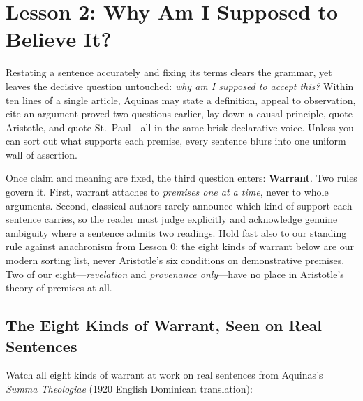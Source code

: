 \section{Lesson 2: Why Am I Supposed to Believe It?}

Restating a sentence accurately and fixing its terms clears the grammar, yet leaves the decisive question untouched: \emph{why am I supposed to accept this?} Within ten lines of a single article, Aquinas may state a definition, appeal to observation, cite an argument proved two questions earlier, lay down a causal principle, quote Aristotle, and quote St.\ Paul---all in the same brisk declarative voice. Unless you can sort out what supports each premise, every sentence blurs into one uniform wall of assertion.

Once claim and meaning are fixed, the third question enters: \textbf{Warrant}. Two rules govern it. First, warrant attaches to \emph{premises one at a time}, never to whole arguments. Second, classical authors rarely announce which kind of support each sentence carries, so the reader must judge explicitly and acknowledge genuine ambiguity where a sentence admits two readings. Hold fast also to our standing rule against anachronism from Lesson 0: the eight kinds of warrant below are our modern sorting list, never Aristotle's six conditions on demonstrative premises. Two of our eight---\emph{revelation} and \emph{provenance only}---have no place in Aristotle's theory of premises at all.

\subsection{The Eight Kinds of Warrant, Seen on Real Sentences}

Watch all eight kinds of warrant at work on real sentences from Aquinas's \emph{Summa Theologiae} (1920 English Dominican translation):

